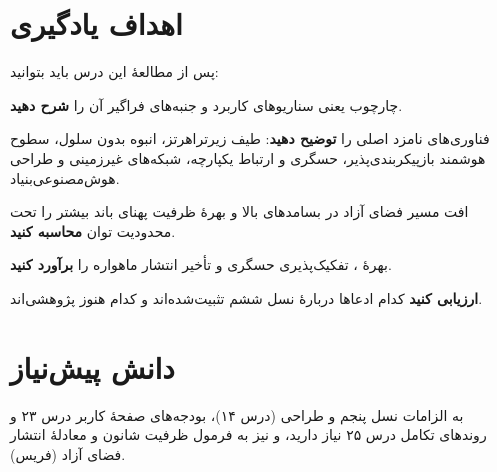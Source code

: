 \documentclass[11pt,a4paper]{article}
\begin{document}
\ACNcover

\section{اهداف یادگیری}
پس از مطالعهٔ این درس باید بتوانید:
\begin{objectives}
  \item چارچوب  یعنی سناریوهای کاربرد و جنبه‌های فراگیر آن را \textbf{شرح دهید}.
  \item فناوری‌های نامزد اصلی را \textbf{توضیح دهید}: طیف زیرتراهرتز،  انبوه بدون سلول، سطوح هوشمند بازپیکربندی‌پذیر، حسگری و ارتباط یکپارچه،
        شبکه‌های غیرزمینی و طراحی هوش‌مصنوعی‌بنیاد.
  \item افت مسیر فضای آزاد در بسامدهای بالا و بهرهٔ ظرفیت پهنای باند بیشتر را تحت محدودیت توان \textbf{محاسبه کنید}.
  \item بهرهٔ ، تفکیک‌پذیری حسگری و تأخیر انتشار ماهواره را \textbf{برآورد کنید}.
  \item \textbf{ارزیابی کنید} کدام ادعاها دربارهٔ نسل ششم تثبیت‌شده‌اند و کدام هنوز پژوهشی‌اند.
\end{objectives}

\section{دانش پیش‌نیاز}
به الزامات نسل پنجم و طراحی  (درس ۱۴)، بودجه‌های صفحهٔ کاربر درس ۲۳ و روندهای تکامل درس ۲۵ نیاز دارید، و نیز به فرمول ظرفیت شانون و معادلهٔ
انتشار فضای آزاد (فریس).
\end{document}
